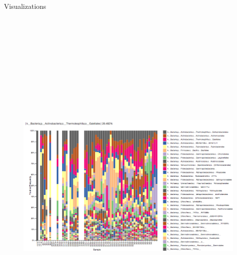 \documentclass[final]{beamer}
\newlength{\colwidth}
\begin{document}
\begin{frame}[t]
\begin{columns}[t]
\begin{column}{\colwidth}
\begin{block}{Visualizations}
    \begin{figure}[tph!]
      {\includegraphics[height=18cm]{assets/taxabar-plot}}
    \end{figure}


\end{block}
\end{column}
\end{columns}
\end{frame}
\end{document}
